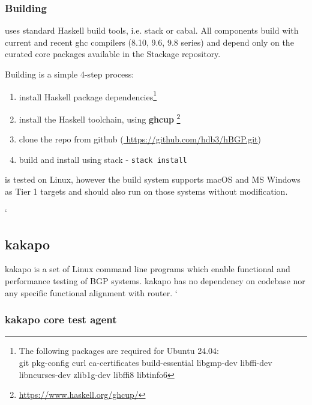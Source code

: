 \subsubsection*{ Building \hbgp }

\hbgp uses standard Haskell build tools, i.e. stack or cabal.  All \hbgp components build with current and recent ghc compilers (8.10, 9.6, 9.8 series) and depend only on the curated core packages available in the Stackage repository.

Building \hbgp is a simple  4-step process:
\begin{enumerate}
    \item install Haskell package dependencies\footnote{The following packages are required for Ubuntu 24.04:\\ git pkg-config curl ca-certificates build-essential libgmp-dev libffi-dev libncurses-dev zlib1g-dev libffi8 libtinfo6}
    \item install the Haskell toolchain, using \textbf{ghcup} \footnote{\url{https://www.haskell.org/ghcup/}}
    \item clone the \hbgp repo from github (\url{ https://github.com/hdb3/hBGP.git})
    \item build and install using stack - \verb|stack install|
\end{enumerate}

\hbgp is tested on Linux, however the build system supports macOS and MS Windows as Tier 1 targets and \hbgp  should also run on those systems without modification.

 `
\subsection{kakapo}

kakapo is a set of Linux command line programs which enable functional and performance testing of BGP systems.  kakapo has no dependency on \hbgp codebase nor any specific functional alignment with \hbgp router. `

\subsubsection*{  kakapo core test agent}

